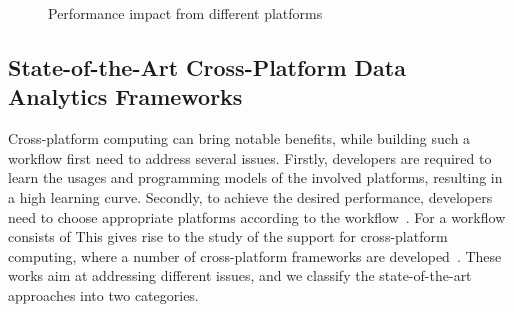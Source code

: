 \begin{figure}
  \centering
  
  \caption{Performance impact from different platforms}
  \label{fig:hetero}
\end{figure}

\subsection{State-of-the-Art Cross-Platform Data Analytics Frameworks}

Cross-platform computing can bring notable benefits, while building such a workflow first need to address several issues. Firstly, developers are required to learn the usages and programming models of the involved platforms, resulting in a high learning curve.
Secondly, to achieve the desired performance, developers need to choose appropriate platforms according to the workflow~\cite{agrawal2016rheem,hutchison2017laradb,gog2015musketeer}.
For a workflow consists of 
This gives rise to the study of the support for cross-platform computing, where a number of cross-platform frameworks are developed~\cite{tsoumakos2013case, tan2017enabling, lu2019multi,gittens2018accelerating}.
These works aim at addressing different issues, and we classify the state-of-the-art approaches into two categories.

